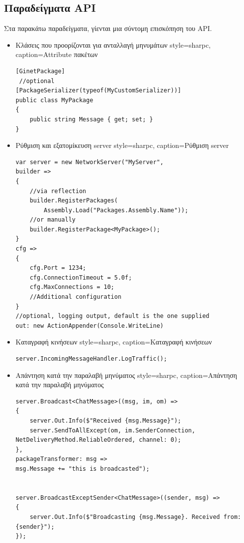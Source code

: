 	\subsection{Παραδείγματα API}
	Στα παρακάτω παραδείγματα, γίενται μια σύντομη επισκόπηση του \gls{API}.
	\begin{itemize}
		\item Κλάσεις που προορίζονται για ανταλλαγή μηνυμάτων
	\lstset
	{
		style=sharpc, 
		caption={Attribute πακέτων}
	}
		\begin{lstlisting}
[GinetPackage]
 //optional
[PackageSerializer(typeof(MyCustomSerializer))]
public class MyPackage
{
    public string Message { get; set; }
}          
		\end{lstlisting}
		\item Ρύθμιση και εξατομίκευση server
	\lstset
	{
		style=sharpc, 
		caption={Ρύθμιση server}
	}
		\begin{lstlisting}     
var server = new NetworkServer("MyServer",
builder =>
{
	//via reflection
	builder.RegisterPackages(
		Assembly.Load("Packages.Assembly.Name"));
	//or manually
	builder.RegisterPackage<MyPackage>();
}
cfg =>
{
	cfg.Port = 1234;
	cfg.ConnectionTimeout = 5.0f;
	cfg.MaxConnections = 10;
	//Additional configuration
}
//optional, logging output, default is the one supplied			 
out: new ActionAppender(Console.WriteLine) 
		\end{lstlisting}
		\item Καταγραφή κινήσεων		
	\lstset
	{
		style=sharpc, 
		caption={Καταγραφή κινήσεων}
	}
		\begin{lstlisting}
server.IncomingMessageHandler.LogTraffic();
		\end{lstlisting}		
		\item Απάντηση κατά την παραλαβή μηνύματος
	\lstset
	{
		style=sharpc, 
		caption={Απάντηση κατά την παραλαβή μηνύματος}
	}
		\begin{lstlisting}
server.Broadcast<ChatMessage>((msg, im, om) =>
{
	server.Out.Info($"Received {msg.Message}");
	server.SendToAllExcept(om, im.SenderConnection, NetDeliveryMethod.ReliableOrdered, channel: 0);
}, 
packageTransformer: msg => 
msg.Message += "this is broadcasted");	


server.BroadcastExceptSender<ChatMessage>((sender, msg) =>
{
	server.Out.Info($"Broadcasting {msg.Message}. Received from: {sender}");
});
		\end{lstlisting} 		


\end{itemize}
